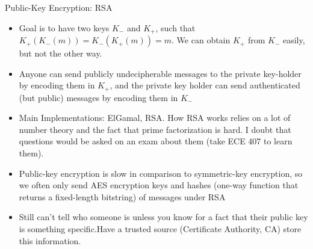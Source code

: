 \documentclass{beamer}
\begin{document}
\begin{frame}[t]{Public-Key Encryption: RSA}
    \begin{itemize}
        \item Goal is to have two keys $K_-$ and $K_+$, such that $K_+(K_-(m)) = K_-(K_+(m)) = m$. We can obtain $K_+$ from $K_-$ easily, but not the other way. 
        \pause\item Anyone can send publicly undecipherable messages to the private key-holder by encoding them in $K_+$, and the private key holder can send authenticated (but public) messages by encoding them in $K_-$ 
        \pause\item \alert{Main Implementations}: ElGamal, RSA. How RSA works relies on a lot of number theory and the fact that prime factorization is hard. I doubt that questions would be asked on an exam about them (take ECE 407 to learn them). 
        \pause\item Public-key encryption is slow in comparison to symmetric-key encryption, so we often only send AES encryption keys and hashes (one-way function that returns a fixed-length bitstring) of messages under RSA
        \pause\item Still can't tell who someone is unless you know for a fact that their public key is something specific.Have a trusted source (\alert{Certificate Authority}, CA) store this information.
    \end{itemize}
\end{frame}
\end{document}
